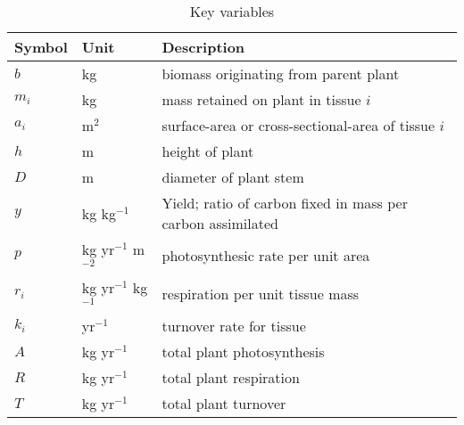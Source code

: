 \documentclass[12pt, a4paper]{article}
\begin{document}
\begin{table}[ht]
 \caption{Key variables
}
\centering

{\footnotesize  %
 \begin{doublespace}
  \begin{tabular}{p{2cm}p{2cm}p{7cm}}
  \hline
  Symbol & Unit & Description \\
  \hline

  $b$   & kg  & biomass originating from parent plant\\
  $m_i$ & kg  & mass retained on plant in tissue $i$\\
  $a_i$ & m$^2$  & surface-area or cross-sectional-area of tissue $i$\\
  $h$   & m  & height of plant\\
  $D$   & m  & diameter of plant stem\\

  $y$ & kg kg$^{-1}$ & Yield; ratio of carbon fixed in mass per carbon assimilated \\
  $p$ & kg yr$^{-1}$ m$^{-2}$  & photosynthesic rate per unit area \\
  $r_i$ & kg yr$^{-1}$ kg$^{-1}$  & respiration per unit tissue mass \\
  $k_i$ & yr$^{-1}$ & turnover rate for tissue \\
  $A$ & kg yr$^{-1}$ & total plant photosynthesis \\
  $R$ & kg yr$^{-1}$ & total plant respiration \\
  $T$ & kg yr$^{-1}$ & total plant turnover \\
  \hline
  \end{tabular}
\end{doublespace}}
\label{tab:definitions}
\end{table}

\newpage
\end{document}
